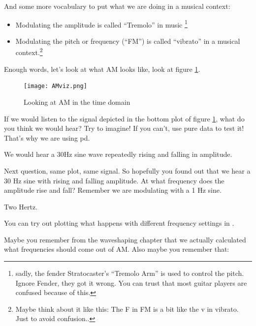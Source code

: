 And some more vocabulary to put what we are doing in a musical context:
\begin{itemize}
	\item Modulating the amplitude is called ``Tremolo'' in music \footnote{sadly, the fender Stratocaster's ``Tremolo Arm'' is used to control the pitch. Ignore Fender, they got it wrong. You can trust that most guitar players are confused because of this.}
	\item Modulating the pitch or frequency (``FM'') is called ``vibrato'' in a musical context.\footnote{Maybe think about it like this: The F in FM is a bit like the v in vibrato. Just to avoid confusion..}
\end{itemize}

Enough words, let's look at what AM looks like, look at figure \ref{fig:AMViz}.

\begin{figure}[h!]
	\centering
	\texttt{[image: AMviz.png]}
	\caption[AM time domain]
	{Looking at AM in the time domain}
	\label{fig:AMViz}
\end{figure}

\begin{question}
	If we would listen to the signal depicted in the bottom plot of figure \ref{fig:AMViz}, what do you think we would hear? Try to imagine! If you can't, use pure data to test it! That's why we are using pd.
\end{question}
\begin{Answer}
	We would hear a 30Hz sine wave repeatedly rising and falling in amplitude.
\end{Answer}

\begin{question}
	Next question, same plot, same signal. So hopefully you found out that we hear a 30 Hz sine with rising and falling amplitude. At what frequency does the amplitude rise and fall? Remember we are modulating with a 1 Hz sine.
\end{question}
\begin{Answer}
	Two Hertz.
\end{Answer}

You can try out plotting what happens with different frequency settings in .

Maybe you remember from the waveshaping chapter that we actually calculated what frequencies should come out of AM. Also maybe you remember that:


